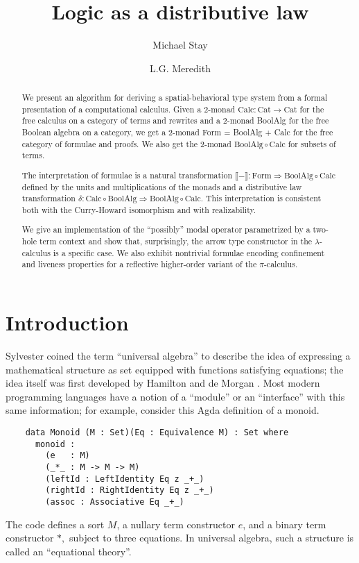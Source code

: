 \documentclass{llncs}
\title{Logic as a distributive law}
\author{
Michael Stay\inst{1}\\
\and
L.G. Meredith\inst{2}\\
}
\institute{
  {Pyrofex Corp.}\\
  \email{\fontsize{8}{8}\selectfont stay@pyrofex.net}\\
  \and
  {Synereo, Ltd}\\
  \email{\fontsize{8}{8}\selectfont greg@synereo.com}
}
\newcommand{\interp}[1]{\llbracket #1 \rrbracket}
\newcommand{\maps}{\colon}
\newcommand{\Cat}{\mathrm{Cat}}
\newcommand{\Calc}{\mathrm{Calc}}
\newcommand{\BoolAlg}{\mathrm{BoolAlg}}
\renewcommand{\Form}{\mathrm{Form}}
\begin{document}
\maketitle
\begin{abstract}
\noindent
  We present an algorithm for deriving a spatial-behavioral type
  system from a formal presentation of a computational calculus.
  Given a 2-monad $\Calc\maps \Cat \to \Cat$ for the free calculus on
  a category of terms and rewrites and a 2-monad BoolAlg for the free
  Boolean algebra on a category, we get a 2-monad Form = BoolAlg +
  Calc for the free category of formulae and proofs.  We also get the
  2-monad $\BoolAlg \circ \Calc$ for subsets of terms.  

  The interpretation of formulae is a natural transformation
  $\interp{-} \maps \Form \Rightarrow \BoolAlg \circ \Calc$ defined by
  the units and multiplications of the monads and a distributive law
  transformation $\delta\maps \Calc \circ \BoolAlg \Rightarrow
  \BoolAlg \circ \Calc.$  This interpretation is consistent both with
  the Curry-Howard isomorphism and with realizability.  

  We give an implementation of the ``possibly'' modal operator
  parametrized by a two-hole term context and show that, surprisingly,
  the arrow type constructor in the $\lambda$-calculus is a specific
  case.  We also exhibit nontrivial formulae encoding confinement and
  liveness properties for a reflective higher-order variant of the
  $\pi$-calculus.  

\end{abstract}
\section{Introduction}
  
  Sylvester coined the term ``universal algebra'' to describe the idea of expressing a mathematical structure as set equipped with functions satisfying equations; the idea itself was first developed by Hamilton and de Morgan \cite{Graetzer}.  Most modern programming languages have a notion of a ``module'' or an ``interface'' with this same information; for example, consider this Agda definition of a monoid.
  \begin{verbatim}
    data Monoid (M : Set)(Eq : Equivalence M) : Set where
      monoid :
        (e   : M)
        (_*_ : M -> M -> M)
        (leftId : LeftIdentity Eq z _+_)
        (rightId : RightIdentity Eq z _+_)
        (assoc : Associative Eq _+_)
  \end{verbatim}
  The code defines a sort $M$, a nullary term constructor $e$, and a
  binary term constructor $*,$ subject to three equations. In
  universal algebra, such a structure is called an ``equational
  theory''.
  
\end{document}
